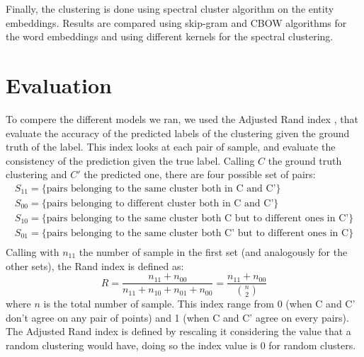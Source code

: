 \documentclass[]{article}
\begin{document}
Finally, the clustering is done using spectral cluster algorithm on the entity embeddings. Results are compared using skip-gram and CBOW algorithms for the word embeddings and using different kernels for the spectral clustering. 



\section{Evaluation}
To compere the different models we ran, we used the Adjusted Rand index \cite{rand},  that evaluate the accuracy of the predicted labels of the clustering given the ground truth of the label. 
This index looks at each pair of sample, and evaluate the consistency of the prediction given the true label. Calling $C$ the ground truth clustering and $C'$ the predicted one, there are four possible set of pairs:
$$
\begin{array}{ll}
S_{11} = \{\text{pairs belonging to the same cluster both in C and C'} \}\\
S_{00} =  \{\text{pairs belonging to different cluster both in C and C'} \}\\
S_{10} =  \{\text{pairs belonging to the same cluster both C but to different ones in C'} \}\\
S_{01} =  \{\text{pairs belonging to the same cluster both C' but to different ones in C} \}\\
\end{array}
$$
Calling with $n_{11}$ the number of sample in the first set (and analogously for the other sets), the Rand index is defined as:
$$
R=\frac{n_{11}+n_{00}}{n_{11}+n_{10}+n_{01}+n_{00}} = \frac{n_{11}+n_{00}}{{ n\choose 2}}
$$
where $n$ is the total number of sample. This index range from 0 (when C and C' don't agree on any pair of points) and 1 (when C and C' agree on every pairs). The Adjusted Rand index is defined by rescaling it considering the value that a random clustering would have, doing so the index value is 0 for random clusters. 
\end{document}
